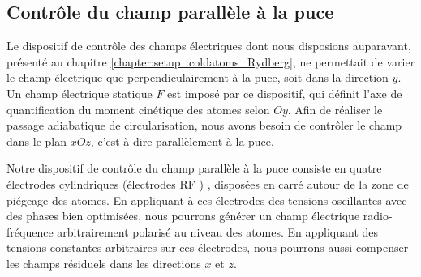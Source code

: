  \subsection{Contrôle du champ parallèle à la puce}%
\noindent Le dispositif de contrôle des champs électriques dont nous disposions auparavant, présenté au chapitre \ref{chapter:setup_coldatoms_Rydberg}, ne permettait de varier le champ électrique que perpendiculairement à la puce, soit dans la direction $y$.
Un champ électrique statique $F$ est imposé par ce dispositif, qui définit l'axe de quantification du moment cinétique des atomes selon $Oy$.
Afin de réaliser le passage adiabatique de circularisation, nous avons besoin de contrôler le champ dans le plan $xOz$, c'est-à-dire parallèlement à la puce. 

Notre dispositif de contrôle du champ parallèle à la puce consiste en quatre électrodes cylindriques (\og électrodes RF \fg{}) , disposées en carré autour de la zone de piégeage des atomes.
En appliquant à ces électrodes des tensions oscillantes avec des phases bien optimisées, nous pourrons générer un champ électrique radio-fréquence arbitrairement polarisé au niveau des atomes.
En appliquant des tensions constantes arbitraires sur ces électrodes, nous pourrons aussi compenser les champs résiduels dans les directions $x$ et $z$.


